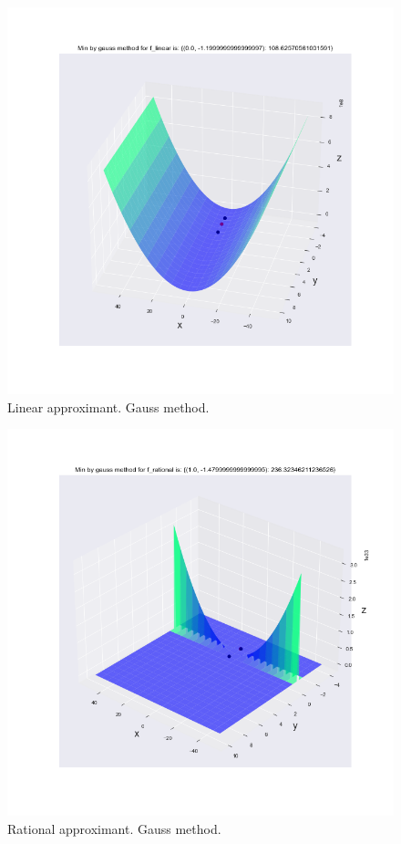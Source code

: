\documentclass[a4paper,article,14pt]{extarticle}
\begin{document}
	\begin{figure}[h]
		\centering
		\includegraphics[scale=0.5]{f_linear_gauss.png}
		\caption{Linear approximant. Gauss method.}
		\label{linearGauss}
	\end{figure} 
	\begin{figure}[h]
	\centering
	\includegraphics[scale=0.5]{f_rational_gauss.png}
	\caption{Rational approximant. Gauss method.}
	\label{rationalGauss}
	\end{figure} 
\end{document}
